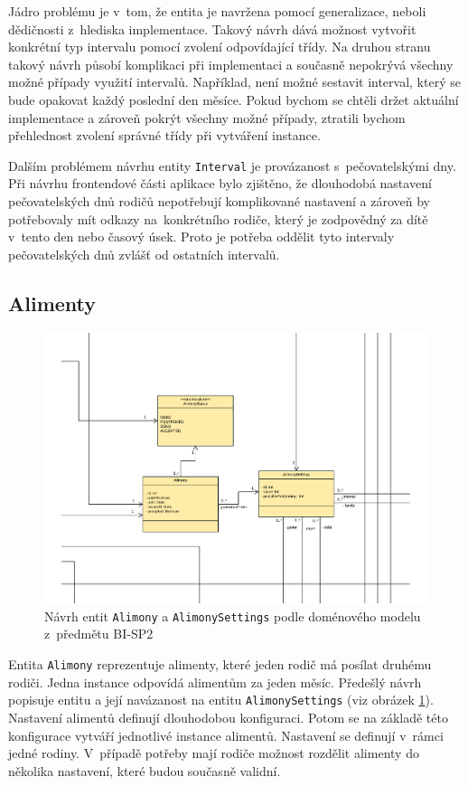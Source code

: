         Jádro problému je v~tom, že entita je navržena pomocí generalizace, neboli dědičnosti z~hlediska implementace. Takový návrh dává možnost vytvořit konkrétní typ intervalu pomocí zvolení odpovídající třídy. Na druhou stranu takový návrh působí komplikaci při implementaci a současně nepokrývá všechny možné případy využití intervalů. Například, není možné sestavit interval, který se bude opakovat každý poslední den měsíce. Pokud bychom se chtěli držet aktuální implementace a zároveň pokrýt všechny možné případy, ztratili bychom přehlednost zvolení správné třídy při vytváření instance.
            
        Dalším problémem návrhu entity \verb|Interval| je provázanost s~pečovatelskými dny. Při návrhu frontendové části aplikace bylo zjištěno, že dlouhodobá nastavení pečovatelských dnů rodičů nepotřebují komplikované nastavení a zároveň by potřebovaly mít odkazy na~konkrétního rodiče, který je zodpovědný za dítě v~tento den nebo časový úsek. Proto je potřeba oddělit tyto intervaly pečovatelských dnů zvlášť od ostatních intervalů.
    
    \subsection{Alimenty}
        \begin{figure}\centering
	        \includegraphics[width=1.0\textwidth]{pdfs/AlimonyDraft1}
	        \caption[Návrh entit \texttt{Alimony} a \texttt{AlimonySettings}]{Návrh entit \texttt{Alimony} a \texttt{AlimonySettings} podle doménového modelu z~předmětu BI-SP2}\label{image:aliomny-draft1}
        \end{figure}
        Entita \verb|Alimony| reprezentuje alimenty, které jeden rodič má posílat druhému rodiči. Jedna instance odpovídá alimentům za jeden měsíc. Předešlý návrh popisuje entitu a její navázanost na entitu \verb|AlimonySettings| (viz obrázek \ref{image:aliomny-draft1}). Nastavení alimentů definují dlouhodobou konfiguraci. Potom se na základě této konfigurace vytváří jednotlivé instance alimentů. Nastavení se definují v~rámci jedné rodiny. V~případě potřeby mají rodiče možnost rozdělit alimenty do několika nastavení, které budou současně validní.
        

